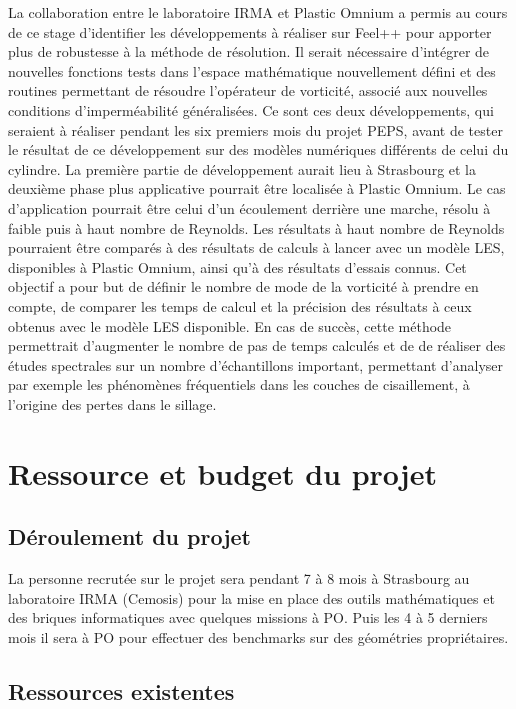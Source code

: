 \documentclass[12pt]{article}
\begin{document}
La collaboration entre le laboratoire IRMA et Plastic Omnium a permis au cours
de ce stage d’identifier les développements à réaliser sur Feel++ pour apporter
plus de robustesse à la méthode de résolution. Il serait nécessaire d’intégrer
de nouvelles fonctions tests dans l’espace mathématique nouvellement défini et
des routines permettant de résoudre l’opérateur de vorticité, associé aux
nouvelles conditions d’imperméabilité généralisées. Ce sont ces deux
développements, qui seraient à réaliser pendant les six premiers mois du projet
PEPS, avant de tester le résultat de ce développement sur des modèles numériques
différents de celui du cylindre. La première partie de développement aurait lieu
à Strasbourg et la deuxième phase plus applicative pourrait être localisée à
Plastic Omnium. Le cas d’application pourrait être celui d’un écoulement
derrière une marche, résolu à faible puis à haut nombre de Reynolds. Les
résultats à haut nombre de Reynolds pourraient être comparés à des résultats de
calculs à lancer avec un modèle LES, disponibles à Plastic Omnium, ainsi qu’à des
résultats d’essais connus. Cet objectif a pour but de définir le nombre de mode
de la vorticité à prendre en compte, de comparer les temps de calcul et la
précision des résultats à ceux obtenus avec le modèle LES disponible. En cas de
succès, cette méthode permettrait d’augmenter le nombre de pas de temps calculés
et de de réaliser des études spectrales sur un nombre d’échantillons important,
permettant d’analyser par exemple les phénomènes fréquentiels dans les couches
de cisaillement, à l’origine des pertes dans le sillage.



\section{Ressource et budget du projet}
\label{sec:budget}

\subsection{Déroulement du projet}
\label{sec:dero-du-proj}

La personne recrutée sur le projet sera pendant 7 à 8 mois à Strasbourg au
laboratoire IRMA (Cemosis) pour la mise en place des outils mathématiques et des
briques informatiques avec quelques missions à PO. Puis les 4 à 5 derniers mois
il sera à PO pour effectuer des benchmarks sur des géométries propriétaires.

\subsection{Ressources existentes}
\end{document}
